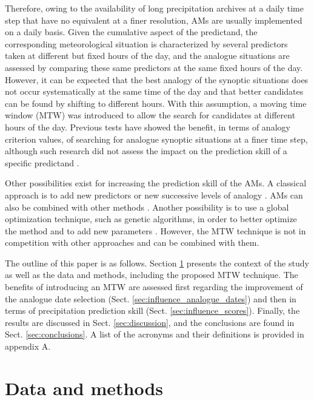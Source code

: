 \documentclass[hess, manuscript]{copernicus}
\begin{document}
	Therefore, owing to the availability of long precipitation archives at a daily time step that have no equivalent at a finer resolution, AMs are usually implemented on a daily basis. Given the cumulative aspect of the predictand, the corresponding meteorological situation is characterized by several predictors taken at different but fixed hours of the day, and the analogue situations are assessed by comparing these same predictors at the same fixed hours of the day. However, it can be expected that the best analogy of the synoptic situations does not occur systematically at the same time of the day and that better candidates can be found by shifting to different hours. With this assumption, a moving time window (MTW) was introduced to allow the search for candidates at different hours of the day. Previous tests have showed the benefit, in terms of analogy criterion values, of searching for analogue synoptic situations at a finer time step, although such research did not assess the impact on the prediction skill of a specific predictand \citep{Finet2008}.
	
	Other possibilities exist for increasing the prediction skill of the AMs. A classical approach is to add new predictors or new successive levels of analogy \citep[e.g.][]{Horton2012a, BenDaoud2016, Caillouet2016}. AMs can also be combined with other methods \citep[e.g.][]{Chardon2014}. Another possibility is to use a global optimization technique, such as genetic algorithms, in order to better optimize the method and to add new parameters \citep{Horton2017}. However, the MTW technique is not in competition with other approaches and can be combined with them.
	
	The outline of this paper is as follows. Section \ref{sec:data_methods} presents the context of the study as well as the data and methods, including the proposed MTW technique. The benefits of introducing an MTW are assessed first regarding the improvement of the analogue date selection (Sect. \ref{sec:influence_analogue_dates}) and then in terms of precipitation prediction skill (Sect. \ref{sec:influence_scores}). Finally, the results are discussed in Sect. \ref{sec:discussion}, and the conclusions are found in Sect. \ref{sec:conclusions}. A list of the acronyms and their definitions is provided in appendix A.
	
	
	\section{Data and methods}
	\label{sec:data_methods}
	
\end{document}
